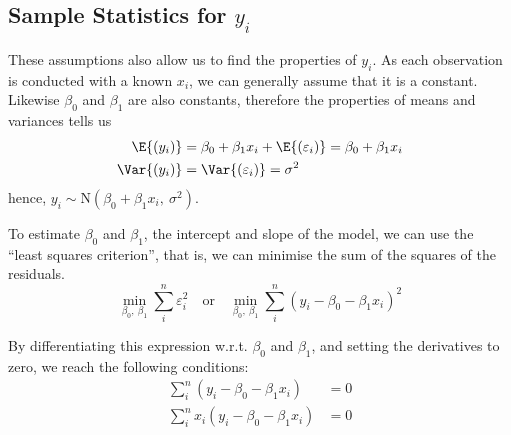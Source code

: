 \documentclass{article}
\begin{document}
\subsection{Sample Statistics for \texorpdfstring{$y_i$}{yi}}
These assumptions also allow us to find the properties of $y_i$. As each observation is conducted with a known $x_i$, we can generally assume that it is a constant.
Likewise $\beta_0$ and $\beta_1$ are also constants, therefore the properties of means and variances tells us
\begin{align*}
    \E{\left( y_i \right)}   & = \beta_0 + \beta_1 x_i + \E{\left( \varepsilon_i \right)} = \beta_0 + \beta_1 x_i \\
    \Var{\left( y_i \right)} & = \Var{\left( \varepsilon_i \right)} = \sigma^2
\end{align*}
hence, $y_i \sim \mathrm{N}\left( \beta_0 + \beta_1 x_i,\: \sigma^2 \right)$.
\begin{definition}
    To estimate $\beta_0$ and $\beta_1$, the intercept and slope of the model,
    we can use the ``least squares criterion'',
    that is, we can minimise the sum of the squares of the residuals.
    \begin{equation*}
        \min_{\beta_0,\: \beta_1}\sum_i^n \varepsilon_i^2 \quad \text{or} \quad \min_{\beta_0,\: \beta_1}\sum_i^n \left( y_i - \beta_0 - \beta_1 x_i \right)^2
    \end{equation*}
\end{definition}
By differentiating this expression w.r.t. $\beta_0$ and $\beta_1$, and setting the derivatives to zero, we reach the following conditions:
\begin{align*}
    \sum_i^n \left( y_i - \beta_0 - \beta_1 x_i \right)    & = 0 \\
    \sum_i^n x_i\left( y_i - \beta_0 - \beta_1 x_i \right) & = 0
\end{align*}
\end{document}
